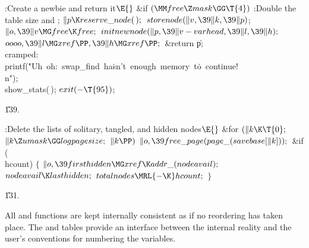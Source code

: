\B{}:Create a newbie and return it\X${}\E{}$\6
\&{if} ${}(\MM\\{free}\Z\\{mask}\GG\T{4}){}$\1\5
:Double the table size and \X;\2\6
${}\|p\K\\{reserve\_node}(\,);{}$\6
${}\\{storenode}(\|v,\39\|k,\39\|p){}$;\5
${}\|o,\39\|v\MG\\{free}\K\\{free};{}$\6
${}\\{initnewnode}(\|p,\39\|v-\\{varhead},\39\|l,\39\|h);{}$\6
${}\\{oooo},\39\|l\MG\\{xref}\PP,\39\|h\MG\\{xref}\PP;{}$\6
\&{return} \|p;\6
\4\\{cramped}:\5
\\{printf}(\.{"Uh\ oh:\ swap\_find\ ha}\)\.{sn't\ enough\ memory\ t}\)\.{o\
continue!\\n"});\6
\\{show\_stats}(\,);\6
${}\\{exit}({-}\T{95}){}$;\par
\U139.\fi

\B{}:Delete the lists of solitary, tangled, and hidden
nodes\X${}\E{}$\6
\&{for} ${}(\|k\K\T{0};{}$ ${}\|k\Z\\{umask}\GG\\{logpagesize};{}$ ${}\|k%
\PP){}$\1\5
${}\|o,\39\\{free\_page}(\\{page\_}(\\{savebase}[\|k]));{}$\2\6
\&{if} (\\{hcount})\5
${}\{{}$\1\6
${}\|o,\39\\{firsthidden}\MG\\{xref}\K\\{addr\_}(\\{nodeavail});{}$\6
${}\\{nodeavail}\K\\{lasthidden};{}$\6
${}\\{totalnodes}\MRL{-{\K}}\\{hcount};{}$\6
\4${}\}{}$\2\par
\U131.\fi

All  and  functions are kept
internally consistent as if
no reordering has taken place. The  and  tables
provide
an interface between the internal reality and the user's conventions
for numbering the variables.

